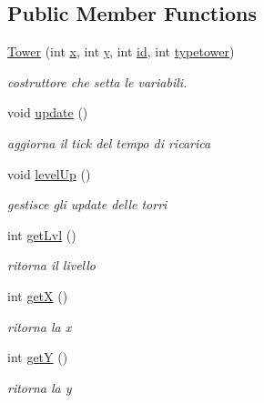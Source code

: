 \subsection*{Public Member Functions}
\begin{DoxyCompactItemize}
\item 
\hyperlink{classtowers_1_1_tower_a5bb75162daea78aafb453f40497281f9}{Tower} (int \hyperlink{classtowers_1_1_tower_a6150e0515f7202e2fb518f7206ed97dc}{x}, int \hyperlink{classtowers_1_1_tower_a0a2f84ed7838f07779ae24c5a9086d33}{y}, int \hyperlink{classtowers_1_1_tower_a7441ef0865bcb3db9b8064dd7375c1ea}{id}, int \hyperlink{classtowers_1_1_tower_a2115b9e9ed7b8b8288b5dae468cbd784}{typetower})
\begin{DoxyCompactList}\small\item\em costruttore che setta le variabili. \end{DoxyCompactList}\item 
void \hyperlink{classtowers_1_1_tower_ac5c54df7ed3b930268c8d7752c101725}{update} ()
\begin{DoxyCompactList}\small\item\em aggiorna il tick del tempo di ricarica \end{DoxyCompactList}\item 
void \hyperlink{classtowers_1_1_tower_ac235927565a120a3157ef902721c105e}{level\+Up} ()
\begin{DoxyCompactList}\small\item\em gestisce gli update delle torri \end{DoxyCompactList}\item 
int \hyperlink{classtowers_1_1_tower_a69ffaa5d69141ba9aed07daf94b18540}{get\+Lvl} ()
\begin{DoxyCompactList}\small\item\em ritorna il livello \end{DoxyCompactList}\item 
int \hyperlink{classtowers_1_1_tower_ae13f88e922e1339355456062ad9fa359}{getX} ()
\begin{DoxyCompactList}\small\item\em ritorna la x \end{DoxyCompactList}\item 
int \hyperlink{classtowers_1_1_tower_aab81944f0a14bba932c0931899951937}{getY} ()
\begin{DoxyCompactList}\small\item\em ritorna la y \end{DoxyCompactList}\item 

\end{DoxyCompactItemize}
